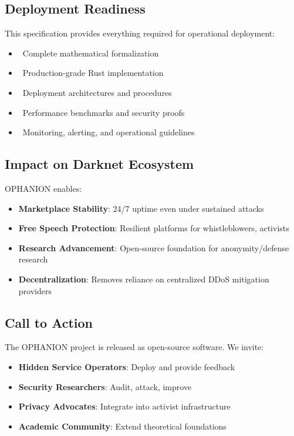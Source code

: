 \documentclass[11pt,a4paper]{article}
\begin{document}
\subsection{Deployment Readiness}

This specification provides everything required for operational deployment:
\begin{itemize}
\item \checkmark\ Complete mathematical formalization
\item \checkmark\ Production-grade Rust implementation
\item \checkmark\ Deployment architectures and procedures
\item \checkmark\ Performance benchmarks and security proofs
\item \checkmark\ Monitoring, alerting, and operational guidelines
\end{itemize}

\subsection{Impact on Darknet Ecosystem}

OPHANION enables:
\begin{itemize}
\item \textbf{Marketplace Stability}: 24/7 uptime even under sustained attacks
\item \textbf{Free Speech Protection}: Resilient platforms for whistleblowers, activists
\item \textbf{Research Advancement}: Open-source foundation for anonymity/defense research
\item \textbf{Decentralization}: Removes reliance on centralized DDoS mitigation providers
\end{itemize}

\subsection{Call to Action}

The OPHANION project is released as open-source software. We invite:
\begin{itemize}
\item \textbf{Hidden Service Operators}: Deploy and provide feedback
\item \textbf{Security Researchers}: Audit, attack, improve
\item \textbf{Privacy Advocates}: Integrate into activist infrastructure
\item \textbf{Academic Community}: Extend theoretical foundations
\end{itemize}
\end{document}
